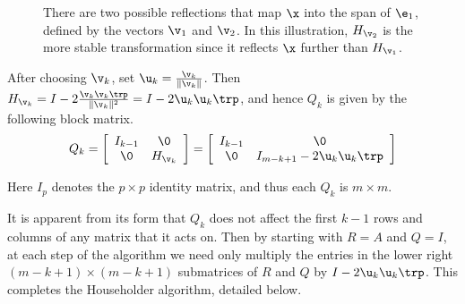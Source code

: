 \begin{figure}[H] %
\caption{There are two possible reflections that map $\x$ into the span of $\e_1$, defined by the vectors $\v_1$ and $\v_2$.
In this illustration, $H_{\v_2}$ is the more stable transformation since it reflects $\x$ further than $H_{\v_1}$.}
\label{fig:householder-two-possible-reflectors}
\end{figure}

After choosing $\v_k$, set $\u_k = \frac{\v_k}{\|\v_k\|}$.
Then $H_{\v_k} = I - 2\frac{\v_k\v_k\trp}{\|\v_k\|^2} = I - 2\u_k\u_k\trp$, and hence $Q_k$ is given by the following block matrix.
%
\begin{equation*}
Q_k =
\left[\begin{array}{cc}
I_{k-1} & \0 \\
\0      & H_{\v_k} \\
\end{array}\right] =
\left[\begin{array}{cc}
I_{k-1} & \0 \\
\0      & I_{m-k+1} - 2 \u_k\u_k\trp \\
\end{array}\right]
\end{equation*}

Here $I_{p}$ denotes the $p \times p$ identity matrix, and thus each $Q_k$ is $m \times m$.

It is apparent from its form that $Q_k$ does not affect the first $k-1$ rows and columns of any matrix that it acts on.
Then by starting with $R = A$ and $Q = I$, at each step of the algorithm we need only multiply the entries in the lower right $(m-k+1) \times (m-k+1)$ submatrices of $R$ and $Q$ by $I-2\u_k\u_k\trp$.
This completes the Householder algorithm, detailed below.

